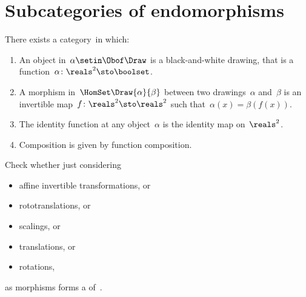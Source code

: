 
{
\section{Subcategories of endomorphisms}
\label{sec:Draw}

\begin{definition}[Drawings]
    \label{def:Draw}
    There exists a category~\Draw in which:
    \begin{enumerate}
        \item An object in~$\alpha\setin \Obof\Draw$ is a black-and-white drawing,
              that is a function~$\alpha \colon \reals^2 \sto \boolset$.
        \item A morphism in~$\HomSet\Draw{\alpha}{\beta}$ between two drawings~$\alpha$ and~$\beta$ is an invertible map~$f\colon \reals^2 \sto \reals^2$ such that~$\alpha(x) = \beta(f(x))$.
        \item The identity function at any object~$\alpha$ is the identity map on~$\reals^2$.
        \item Composition is given by function composition.
    \end{enumerate}
\end{definition}

\begin{exercise}
    \label{ex:draw}
    Check whether just considering
    \begin{itemize}
        \item affine invertible transformations, or
        \item rototranslations, or
        \item scalings, or
        \item translations, or
        \item rotations,
    \end{itemize}
    as morphisms forms a  of~\Draw.
\end{exercise}
\begin{solution}
    \begin{marginfigure}
        \begin{center}
        \end{center}
        \caption{Example of scaling.}
    \end{marginfigure}


\end{solution}}
